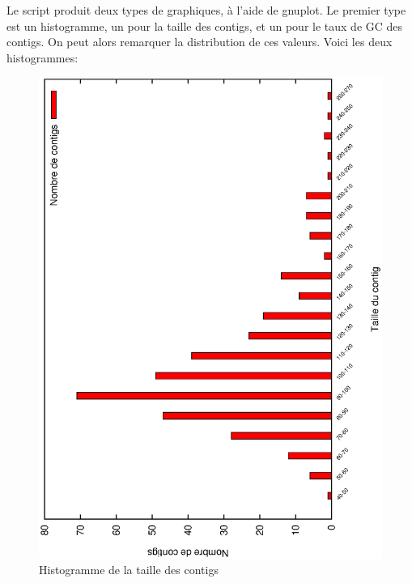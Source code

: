 \documentclass[10.9pt]{article} %
\begin{document}
Le script produit deux types de graphiques, à l'aide de gnuplot. Le premier type est un
histogramme, un pour la taille des contigs, et un pour le taux de GC des contigs. On peut
alors remarquer la distribution de ces valeurs. Voici les deux histogrammes:
\begin{figure}[p]
\centering
\includegraphics[scale=0.6,angle=270]{histogramme_taille.eps}
\caption{Histogramme de la taille des contigs}

\end{figure}
\end{document}
